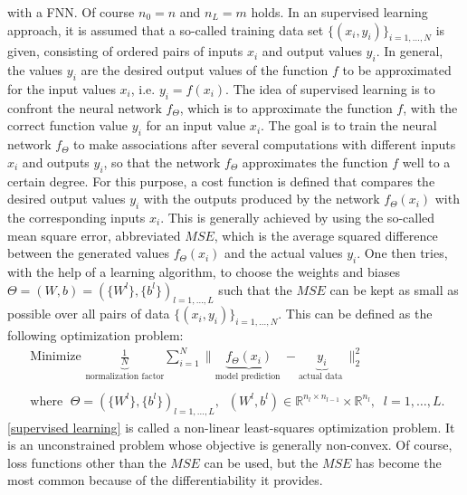 with a FNN. Of course $n_0 = n$ and $n_L = m$ holds. In an supervised learning approach, it is assumed that a so-called training data set $\{ (x_i, y_i) \}_{i = 1, \ldots, N}$ is given, consisting of ordered pairs of inputs $x_i$ and output values $y_i$. In general, the values $y_i$ are the desired output values of the function $f$ to be approximated for the input values $x_i$, i.e. $y_i = f(x_i)$. The idea of supervised learning is to confront the neural network $f_{\Theta}$, which is to approximate the function $f$, with the correct function value $y_i$ for an input value $x_i$. The goal is to train the neural network $f_{\Theta}$ to make associations after several computations with different inputs $x_i$ and outputs $y_i$, so that the network $f_{\Theta}$ approximates the function $f$ well to a certain degree. For this purpose, a cost function is defined that compares the desired output values $y_i$ with the outputs produced by the network $f_{\Theta}(x_i)$ with the corresponding inputs $x_i$. This is generally achieved by using the so-called mean square error, abbreviated $MSE$, which is the average squared difference between the generated values $f_{\Theta}(x_i)$ and the actual values $y_i$. One then tries, with the help of a learning algorithm, to choose the weights and biases $\Theta = (W, b) = (\{ W^l \}, \{ b^l \})_{l = 1, \ldots, L}$ such that the $MSE$ can be kept as small as possible over all pairs of data $\{ (x_i, y_i) \}_{i = 1, \ldots, N}$. This can be defined as the following optimization problem:
\begin{equation}
    \label{supervised learning}
    \begin{gathered}
        \text{ Minimize } \underbrace{\frac{1}{N}}_{\text{normalization factor}} \sum_{i=1}^{N} \lVert \underbrace{ f_{\Theta} \left(x_{i}\right)}_{\text{model prediction }} - \underbrace{y_{i}}_{\text{actual data }} \rVert^{2}_2 \\
        \\
        \text{ where } \; \Theta = (\{ W^l \}, \{ b^l \})_{l = 1, \ldots, L}, \; \; \left(W^{l}, b^{l}\right) \in \mathbb{R}^{n_l \times n_{l-1}} \times \mathbb{R}^{n_l}, \; \; l=1, \ldots, L .
    \end{gathered}
\end{equation}
\cref{supervised learning} is called a non-linear least-squares optimization problem. It is an unconstrained problem whose objective is generally non-convex. Of course, loss functions other than the $MSE$ can be used, but the $MSE$ has become the most common because of the differentiability it provides. \\
